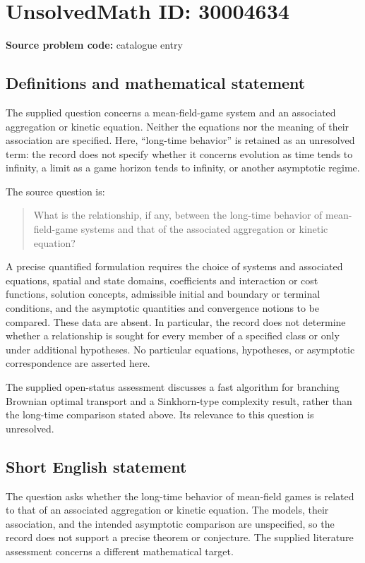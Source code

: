 \documentclass[11pt]{article}
\begin{document}
\section*{UnsolvedMath ID: 30004634}
\textbf{Source problem code:} catalogue entry
\subsection{Definitions and mathematical statement}
The supplied question concerns a mean-field-game system and an associated aggregation or kinetic equation. Neither the equations nor the meaning of their association are specified. Here, ``long-time behavior'' is retained as an unresolved term: the record does not specify whether it concerns evolution as time tends to infinity, a limit as a game horizon tends to infinity, or another asymptotic regime.

The source question is:
\begin{quote}
What is the relationship, if any, between the long-time behavior of mean-field-game systems and that of the associated aggregation or kinetic equation?
\end{quote}

A precise quantified formulation requires the choice of systems and associated equations, spatial and state domains, coefficients and interaction or cost functions, solution concepts, admissible initial and boundary or terminal conditions, and the asymptotic quantities and convergence notions to be compared. These data are absent. In particular, the record does not determine whether a relationship is sought for every member of a specified class or only under additional hypotheses. No particular equations, hypotheses, or asymptotic correspondence are asserted here.

The supplied open-status assessment discusses a fast algorithm for branching Brownian optimal transport and a Sinkhorn-type complexity result, rather than the long-time comparison stated above. Its relevance to this question is unresolved.
\subsection{Short English statement}
The question asks whether the long-time behavior of mean-field games is related to that of an associated aggregation or kinetic equation. The models, their association, and the intended asymptotic comparison are unspecified, so the record does not support a precise theorem or conjecture. The supplied literature assessment concerns a different mathematical target.
\end{document}
